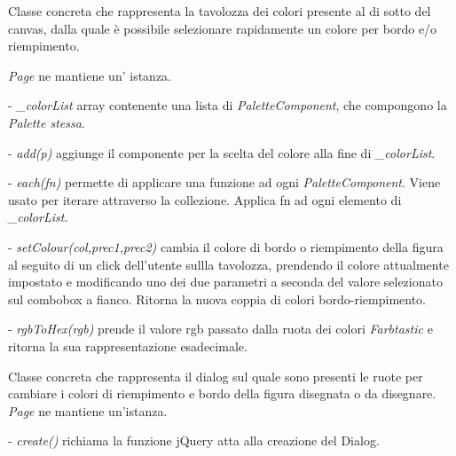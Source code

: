 Classe concreta che rappresenta la tavolozza dei colori presente al di sotto del canvas, dalla quale \` e possibile selezionare rapidamente un colore per bordo e/o riempimento.

\textit{Page} ne mantiene un' istanza.
\begin{elencopuntato}[\subsubsecindent]
\item[-] \textit{{\_}colorList} array contenente una lista di \textit{PaletteComponent}, che compongono la \textit{Palette stessa}.
\end{elencopuntato}
\begin{elencopuntato}[\subsubsecindent]
\item[-] \textit{add(p)} aggiunge il componente per la scelta del colore alla fine di \textit{{\_}colorList}.
\item[-]  \textit{each(fn)} permette di applicare una funzione ad ogni \textit{PaletteComponent}. Viene usato per iterare attraverso la collezione. Applica fn ad ogni elemento di \textit{{\_}colorList}. 
\item[-]  \textit{setColour(col,prec1,prec2)} cambia il colore di bordo o riempimento della figura al seguito di un click dell'utente sullla tavolozza, prendendo il colore attualmente impostato e modificando uno dei due parametri a seconda del valore selezionato sul combobox a fianco. Ritorna la nuova coppia di colori bordo-riempimento.
\item[-]  \textit{rgbToHex(rgb)} prende il valore rgb passato dalla ruota dei colori \textit{Farbtastic} e ritorna la sua rappresentazione esadecimale.
\end{elencopuntato}

Classe concreta che rappresenta il dialog sul quale sono presenti le ruote per cambiare i colori di riempimento e bordo della figura disegnata o da disegnare.
\textit{Page} ne mantiene un'istanza.

\begin{elencopuntato}[\subsubsecindent]
\item[-] \textit{create()} richiama la funzione jQuery atta alla creazione del Dialog.
\end{elencopuntato}


